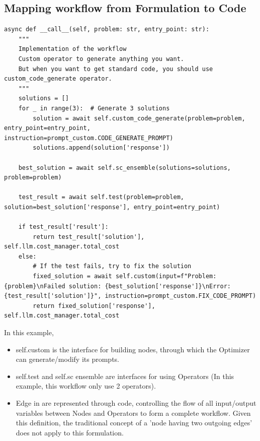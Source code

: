 \subsection{Mapping workflow from Formulation to Code}

\begin{tcolorbox}[title={\textbf{\small An example of Workflow}}, boxrule=1pt, arc=0mm, colback=black!5!white, colframe=black!75!white, breakable, before skip=10pt, after skip=10pt, pad at break=2mm, parbox=false] \begin{verbatim}
async def __call__(self, problem: str, entry_point: str):
    """
    Implementation of the workflow
    Custom operator to generate anything you want.
    But when you want to get standard code, you should use custom_code_generate operator.
    """
    solutions = []
    for _ in range(3):  # Generate 3 solutions
        solution = await self.custom_code_generate(problem=problem, entry_point=entry_point, instruction=prompt_custom.CODE_GENERATE_PROMPT)
        solutions.append(solution['response'])
    
    best_solution = await self.sc_ensemble(solutions=solutions, problem=problem)
    
    test_result = await self.test(problem=problem, solution=best_solution['response'], entry_point=entry_point)
    
    if test_result['result']:
        return test_result['solution'], self.llm.cost_manager.total_cost
    else:
        # If the test fails, try to fix the solution
        fixed_solution = await self.custom(input=f"Problem: {problem}\nFailed solution: {best_solution['response']}\nError: {test_result['solution']}", instruction=prompt_custom.FIX_CODE_PROMPT)
        return fixed_solution['response'], self.llm.cost_manager.total_cost
\end{verbatim}
\end{tcolorbox}

In this example,
\begin{itemize}[leftmargin=20pt]
    \item self.custom is the interface for building nodes, through which the Optimizer can generate/modify its prompts.    
    \item self.test and self.sc ensemble are interfaces for using Operators (In this example, this workflow only use 2 operators).
    \item Edge in \model are represented through code, controlling the flow of all input/output variables between Nodes and Operators to form a complete workflow. Given this definition, the traditional concept of a 'node having two outgoing edges' does not apply to this formulation.
\end{itemize}

